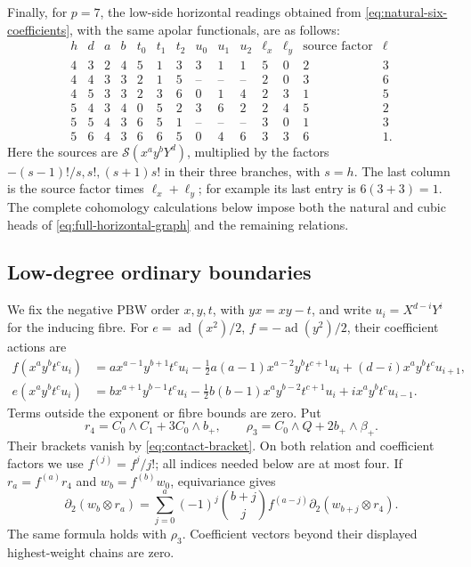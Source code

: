 \documentclass[11pt]{article}
\theoremstyle{plain}
\theoremstyle{definition}
\theoremstyle{remark}
\numberwithin{equation}{section}
\begin{document}
Finally, for \(p=7\), the low-side horizontal readings obtained from
\eqref{eq:natural-six-coefficients}, with the same apolar functionals,
are as follows:
\[
\begin{array}{cc|cc|ccc|ccc|cc|c|c}
h&d&a&b&t_0&t_1&t_2&u_0&u_1&u_2&\ell_x&\ell_y&
 \text{source factor}&\ell\\ \hline
4&3&2&4&5&1&3&3&1&1&5&0&2&3\\
4&4&3&3&2&1&5&\text{--}&\text{--}&\text{--}&2&0&3&6\\
4&5&3&3&2&3&6&0&1&4&2&3&1&5\\
5&4&3&4&0&5&2&3&6&2&2&4&5&2\\
5&5&4&3&6&5&1&\text{--}&\text{--}&\text{--}&3&0&1&3\\
5&6&4&3&6&6&5&0&4&6&3&3&6&1 .
\end{array}
\]
Here the sources are \(\mathscr S(x^ay^bY^d)\), multiplied by
the factors \(-(s-1)!/s,s!,(s+1)s!\) in their three branches,
with \(s=h\).
The last column is the source factor times \(\ell_x+\ell_y\);
for example its last entry is \(6(3+3)=1\).
The complete cohomology calculations below impose both the
natural and cubic heads of \eqref{eq:full-horizontal-graph}
and the remaining relations.

\subsection{Low-degree ordinary boundaries}\label{sec:lowrows}

We fix the negative PBW order \(x,y,t\), with \(yx=xy-t\), and
write \(u_i=X^{d-i}Y^i\) for the inducing fibre.
For \(e=\operatorname{ad}(x^2)/2\), \(f=-\operatorname{ad}(y^2)/2\), their coefficient actions are
\begin{align*}
 f(x^ay^bt^cu_i)
 &=a x^{a-1}y^{b+1}t^cu_i
   -\tfrac12a(a-1)x^{a-2}y^bt^{c+1}u_i
   +(d-i)x^ay^bt^cu_{i+1},\\
 e(x^ay^bt^cu_i)
 &=b x^{a+1}y^{b-1}t^cu_i
   -\tfrac12b(b-1)x^ay^{b-2}t^{c+1}u_i
   +i x^ay^bt^cu_{i-1}.
\end{align*}
Terms outside the exponent or fibre bounds are zero.
Put
\[
 r_4=C_0\wedge C_1+3C_0\wedge b_+,\qquad
 \rho_3=C_0\wedge Q+2b_+\wedge\beta_+.
\]
Their brackets vanish by \eqref{eq:contact-bracket}.
On both relation and coefficient factors we use \(f^{(j)}=f^j/j!\);
all indices needed below are at most four.
If \(r_a=f^{(a)}r_4\) and \(w_b=f^{(b)}w_0\), equivariance gives
\begin{equation}\label{eq:boundary-divided-recursion}
 \partial_2(w_b\otimes r_a)=
 \sum_{j=0}^a(-1)^j\binom{b+j}{j}
        f^{(a-j)}\partial_2(w_{b+j}\otimes r_4).
\end{equation}
The same formula holds with \(\rho_3\). Coefficient vectors beyond their
displayed highest-weight chains are zero.
\end{document}
